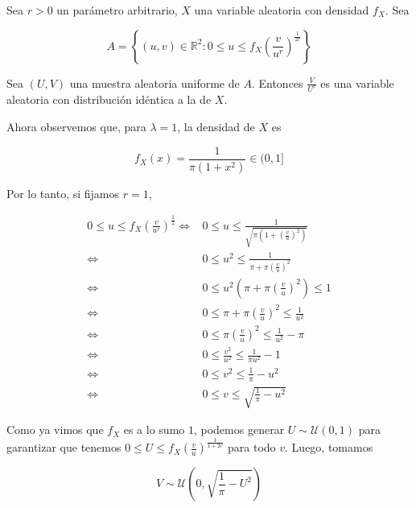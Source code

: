 \documentclass[a4paper, 12pt]{article}
\begin{document}
\begin{helpframe}
Sea $r > 0$ un parámetro arbitrario, $X$ una variable aleatoria con densidad
$f_X$. Sea 

\begin{equation*} A = \left\{ (u, v) \in \mathbb{R}^{2} : 0 \leq u \leq
f_X\left( \frac{v}{u^r} \right)^{\frac{1}{2r}}  \right\} \end{equation*}

Sea $(U, V)$ una muestra aleatoria uniforme de $A$. Entonces $\frac{V}{U^r}$ es
una variable aleatoria con distribución idéntica a la de $X$.
\end{helpframe}

Ahora observemos que, para $\lambda = 1$, la densidad de $X$ es 

\begin{equation*}
  f_X(x) = \frac{1}{\pi\left( 1 + x^2 \right) } \in (0, 1]
\end{equation*}

Por lo tanto, si fijamos $r = 1$,

\begin{align*}
  0 \leq u \leq f_X\left( \frac{v}{u^r} \right)^{\frac{1}{2}}  
  \iff &0 \leq u \leq
  \frac{1}{\sqrt{\pi\left( 1 + \left( \frac{v}{u} \right)^2 \right)}  } \\ 
  \iff&0 \leq u^2 \leq \frac{1}{\pi + \pi\left( \frac{v}{u} \right)^2 } \\ 
  \iff&0 \leq u^2 \left( \pi + \pi\left( \frac{v}{u} \right)^2  \right) \leq 1
  \\ 
  \iff&0 \leq \pi + \pi\left( \frac{v}{u} \right)^2 \leq \frac{1}{u^2} \\ 
  \iff&0 \leq \pi \left( \frac{v}{u} \right)^2 \leq \frac{1}{u^2} - \pi \\ 
  \iff&0 \leq \frac{v^2}{u^2} \leq \frac{1}{\pi u^2} - 1 \\ 
  \iff &0 \leq v^2 \leq \frac{1}{\pi} - u^2 \\ 
  \iff&0 \leq v \leq \sqrt{\frac{1}{\pi} - u^2} 
\end{align*}

Como ya vimos que $f_X$ es a lo sumo $1$, podemos generar $U \sim \mathcal{U}(0,
1)$ para garantizar que tenemos $0 \leq U \leq f_X\left( \frac{v}{u}
\right)^{\frac{1}{1 + 2r}} $ para todo $v$. Luego, tomamos 

\begin{equation*}
  V \sim \mathcal{U} \left( 0, \sqrt{\frac{1}{\pi} - U^2}  \right) 
\end{equation*}
\end{document}
